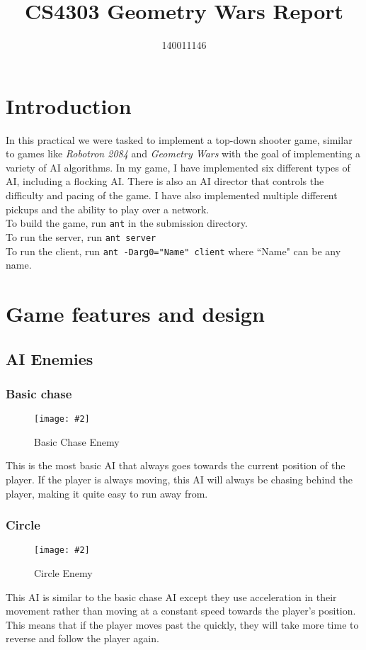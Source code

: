 \documentclass{article}
\title{CS4303 Geometry Wars Report}
\author{140011146}
\newcommand{\n}[0]{\\[\baselineskip]}
\newcommand{\figimg}[3]{
  \begin{figure}[H]
    \centering
    \texttt{[image: \#2]}
    \caption{#3}
  \end{figure}
  \noindent 
}
\begin{document}
\maketitle

\section{Introduction}
In this practical we were tasked to implement a top-down shooter game, similar to games like \textit{Robotron 2084} and \textit{Geometry Wars} with the goal of implementing a variety of AI algorithms. In my game, I have implemented six different types of AI, including a flocking AI. There is also an AI director that controls the difficulty and pacing of the game. I have also implemented multiple different pickups and the ability to play over a network.
\n
To build the game, run \texttt{ant} in the submission directory.
\\
\noindent
To run the server, run \texttt{ant server}
\\
\noindent
To run the client, run \texttt{ant -Darg0="Name" client} where ``Name" can be any name.
\section{Game features and design}
\subsection{AI Enemies}
\subsubsection{Basic chase}
\figimg{0.1}{imgs/BasicChaseEnemy.png}{Basic Chase Enemy}
This is the most basic AI that always goes towards the current position of the player. If the player is always moving, this AI will always be chasing behind the player, making it quite easy to run away from.

\subsubsection{Circle}
\figimg{0.1}{imgs/CircleEnemy.png}{Circle Enemy}
This AI is similar to the basic chase AI except they use acceleration in their movement rather than moving at a constant speed towards the player's position. This means that if the player moves past the quickly, they will take more time to reverse and follow the player again. 
\end{document}
